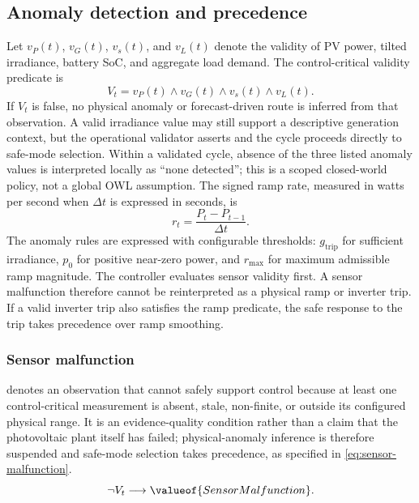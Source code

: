 \subsection{Anomaly detection and precedence}

Let $v_P(t)$, $v_G(t)$, $v_s(t)$, and $v_L(t)$ denote the validity of PV power, tilted irradiance, battery SoC, and aggregate load demand. The control-critical validity predicate is
\begin{equation*}
V_t=v_P(t)\wedge v_G(t)\wedge v_s(t)\wedge v_L(t).
\end{equation*}
If $V_t$ is false, no physical anomaly or forecast-driven route is inferred from that observation. A valid irradiance value may still support a descriptive generation context, but the operational validator asserts  and the cycle proceeds directly to safe-mode selection. Within a validated cycle, absence of the three listed anomaly values is interpreted locally as ``none detected''; this is a scoped closed-world policy, not a global OWL assumption.
The signed ramp rate, measured in watts per second when $\Delta t$ is expressed in seconds, is
\begin{equation}
\label{eq:signed-ramp}
r_t=\frac{P_t-P_{t-1}}{\Delta t}.
\end{equation}
The anomaly rules are expressed with configurable thresholds: $g_{\mathrm{trip}}$ for sufficient irradiance, $p_0$ for positive near-zero power, and $r_{\max}$ for maximum admissible ramp magnitude.
The controller evaluates sensor validity first. A sensor malfunction therefore cannot be reinterpreted as a physical ramp or inverter trip. If a valid inverter trip also satisfies the ramp predicate, the safe response to the trip takes precedence over ramp smoothing.

\subsubsection{Sensor malfunction}

 denotes an observation that cannot safely support control because at least one control-critical measurement is absent, stale, non-finite, or outside its configured physical range. It is an evidence-quality condition rather than a claim that the photovoltaic plant itself has failed; physical-anomaly inference is therefore suspended and safe-mode selection takes precedence, as specified in \autoref{eq:sensor-malfunction}.
\begin{equation}
\neg V_t \longrightarrow \valueof{SensorMalfunction}.
\label{eq:sensor-malfunction}
\end{equation}

